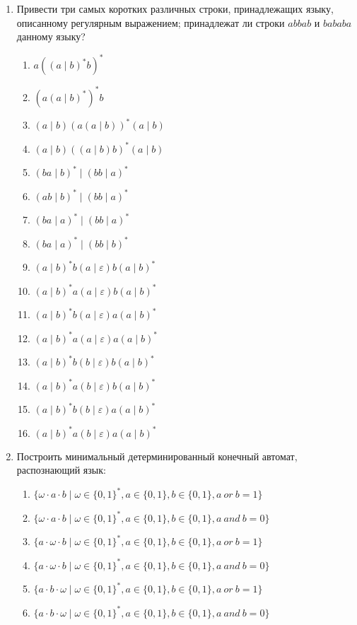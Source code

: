 \documentclass[12pt]{article}
\begin{document}
\newpage


\begin{enumerate}
\setlength\itemsep{1em}

  \item Привести три самых коротких различных строки, принадлежащих языку, описанному регулярным выражением; принадлежат ли строки $abbab$ и $bababa$ данному языку?
  \begin{enumerate}[label=\arabic*)]
    \setlength\itemsep{0.8em}
    \item $a ((a \mid b)^* b)^* $
    \item $(a (a \mid b)^*)^* b $
    \item $(a \mid b) (a (a \mid b))^* (a \mid b) $
    \item $(a \mid b) ((a \mid b) b)^* (a \mid b) $
    \item $(ba \mid b)^* \mid (bb \mid a)^*$
    \item $(ab \mid b)^* \mid (bb \mid a)^*$
    \item $(ba \mid a)^* \mid (bb \mid a)^*$
    \item $(ba \mid a)^* \mid (bb \mid b)^*$
    \item $(a \mid b)^* b (a \mid \varepsilon) b (a \mid b)^*$
    \item $(a \mid b)^* a (a \mid \varepsilon) b (a \mid b)^*$
    \item $(a \mid b)^* b (a \mid \varepsilon) a (a \mid b)^*$
    \item $(a \mid b)^* a (a \mid \varepsilon) a (a \mid b)^*$
    \item $(a \mid b)^* b (b \mid \varepsilon) b (a \mid b)^*$
    \item $(a \mid b)^* a (b \mid \varepsilon) b (a \mid b)^*$
    \item $(a \mid b)^* b (b \mid \varepsilon) a (a \mid b)^*$
    \item $(a \mid b)^* a (b \mid \varepsilon) a (a \mid b)^*$
  \end{enumerate}

  \item Построить минимальный детерминированный конечный автомат, распознающий язык:
  \begin{enumerate}[label=\arabic*)]
    \setlength\itemsep{0.8em}
    \item $\{ \omega \cdot a \cdot b \mid \omega \in \{0, 1\}^*, a \in \{0, 1\}, b \in \{0, 1\}, a \ or \ b = 1 \}$
    \item $\{ \omega \cdot a \cdot b \mid \omega \in \{0, 1\}^*, a \in \{0, 1\}, b \in \{0, 1\}, a \ and \ b = 0 \}$
    \item $\{ a \cdot \omega \cdot b \mid \omega \in \{0, 1\}^*, a \in \{0, 1\}, b \in \{0, 1\}, a \ or \ b = 1 \}$
    \item $\{ a \cdot \omega \cdot b \mid \omega \in \{0, 1\}^*, a \in \{0, 1\}, b \in \{0, 1\}, a \ and \ b = 0 \}$
    \item $\{ a \cdot b \cdot \omega \mid \omega \in \{0, 1\}^*, a \in \{0, 1\}, b \in \{0, 1\}, a \ or \ b = 1 \}$
    \item $\{ a \cdot b \cdot \omega \mid \omega \in \{0, 1\}^*, a \in \{0, 1\}, b \in \{0, 1\}, a \ and \ b = 0 \}$



\end{enumerate}
\end{enumerate}
\end{document}
